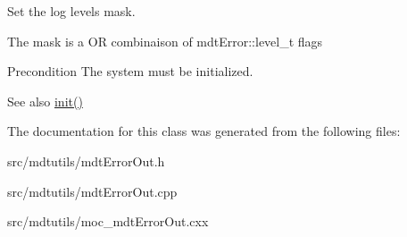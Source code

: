 Set the log levels mask. 

The mask is a OR combinaison of mdtError::level\_\-t flags \begin{DoxyPrecond}{Precondition}
The system must be initialized. 
\end{DoxyPrecond}
\begin{DoxySeeAlso}{See also}
\hyperlink{classmdt_error_out_a9c7f05b03d0f09ff02e8f747bdcd1de7}{init()} 
\end{DoxySeeAlso}


The documentation for this class was generated from the following files:\begin{DoxyCompactItemize}
\item 
src/mdtutils/mdtErrorOut.h\item 
src/mdtutils/mdtErrorOut.cpp\item 
src/mdtutils/moc\_\-mdtErrorOut.cxx\end{DoxyCompactItemize}
